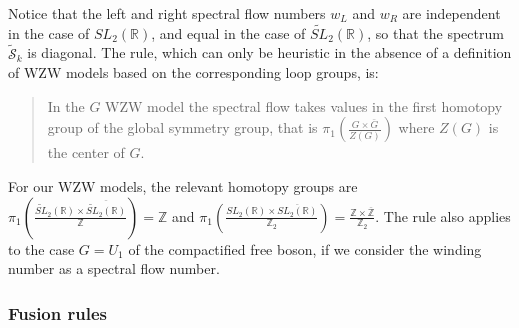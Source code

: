 \documentclass[12pt, a4paper, notitlepage, twoside]{report}
\numberwithin{equation}{section}
\theoremstyle{break}
\begin{document}
Notice that the left and right spectral flow numbers $w_L$ and $w_R$ are independent in the case of $SL_2(\mathbb{R})$, and equal in the case of $\widetilde{SL}_2(\mathbb{R})$, so that the spectrum $\tilde{\mathcal{S}}_k$ is diagonal.
The rule, which can only be heuristic in the absence of a definition of WZW models based on the corresponding loop groups, is:
\begin{quote}
 In the $G$ WZW model the spectral flow takes values in the first homotopy group of the global symmetry group, that is $\pi_1(\frac{G\times \bar{G}}{Z(G)})$ where $Z(G)$ is the center of $G$.
\end{quote}
For our WZW models, the relevant homotopy groups are 
$ \pi_1(\frac{\widetilde{SL}_2(\mathbb{R})\times \overline{\widetilde{SL}_2(\mathbb{R})}}{{\mathbb{Z}}}) = {\mathbb{Z}}$ and $\pi_1(\frac{SL_2({\mathbb{R}})\times \overline{SL_2({\mathbb{R}})}}{{\mathbb{Z}}_2}) = \frac{{\mathbb{Z}}\times \overline{{\mathbb{Z}}}}{{\mathbb{Z}}_2}$.
The rule also applies to the case $G=U_1$ of the compactified free boson, if we consider the winding number as a spectral flow number. 

\subsubsection{Fusion rules}
\end{document}
